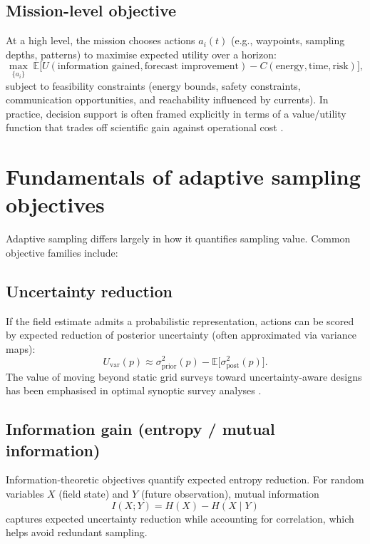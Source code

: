 \subsection{Mission-level objective}
At a high level, the mission chooses actions $a_i(t)$ (e.g., waypoints, sampling depths, patterns) to maximise
expected utility over a horizon:
\begin{equation}
  \max_{\{a_i\}} \; \mathbb{E}\Big[ U(\text{information gained}, \text{forecast improvement}) - C(\text{energy}, \text{time}, \text{risk}) \Big],
\end{equation}
subject to feasibility constraints (energy bounds, safety constraints, communication opportunities, and
reachability influenced by currents). In practice, decision support is often framed explicitly in terms
of a value/utility function that trades off scientific gain against operational cost \parencite{aguiar2020valuefunction}.

\section{Fundamentals of adaptive sampling objectives} \label{sec:adaptive_objectives}

Adaptive sampling differs largely in how it quantifies sampling value. Common objective families include:

\subsection{Uncertainty reduction}
If the field estimate admits a probabilistic representation, actions can be scored by expected reduction of posterior
uncertainty (often approximated via variance maps):
\begin{equation}
  U_{\text{var}}(p) \approx \sigma^2_{\text{prior}}(p) - \mathbb{E}\big[\sigma^2_{\text{post}}(p)\big].
\end{equation}
The value of moving beyond static grid surveys toward uncertainty-aware designs has been emphasised in optimal
synoptic survey analyses \parencite{frolov2014grid}.

\subsection{Information gain (entropy / mutual information)}
Information-theoretic objectives quantify expected entropy reduction. For random variables $X$ (field state) and
$Y$ (future observation), mutual information
\begin{equation}
  I(X;Y) = H(X) - H(X \mid Y)
\end{equation}
captures expected uncertainty reduction while accounting for correlation, which helps avoid redundant sampling.

